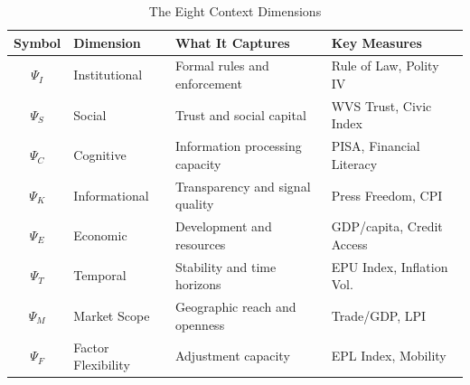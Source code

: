 \begin{table}[htbp]
\centering
\caption{The Eight Context Dimensions}
\label{tab:psi-intro}
\small
\begin{tabular}{@{}clll@{}}
\toprule
\textbf{Symbol} & \textbf{Dimension} & \textbf{What It Captures} & \textbf{Key Measures} \\
\midrule
$\Psi_I$ & Institutional & Formal rules and enforcement & Rule of Law, Polity IV \\
$\Psi_S$ & Social & Trust and social capital & WVS Trust, Civic Index \\
$\Psi_C$ & Cognitive & Information processing capacity & PISA, Financial Literacy \\
$\Psi_K$ & Informational & Transparency and signal quality & Press Freedom, CPI \\
$\Psi_E$ & Economic & Development and resources & GDP/capita, Credit Access \\
$\Psi_T$ & Temporal & Stability and time horizons & EPU Index, Inflation Vol. \\
$\Psi_M$ & Market Scope & Geographic reach and openness & Trade/GDP, LPI \\
$\Psi_F$ & Factor Flexibility & Adjustment capacity & EPL Index, Mobility \\
\bottomrule
\end{tabular}
\end{table}

